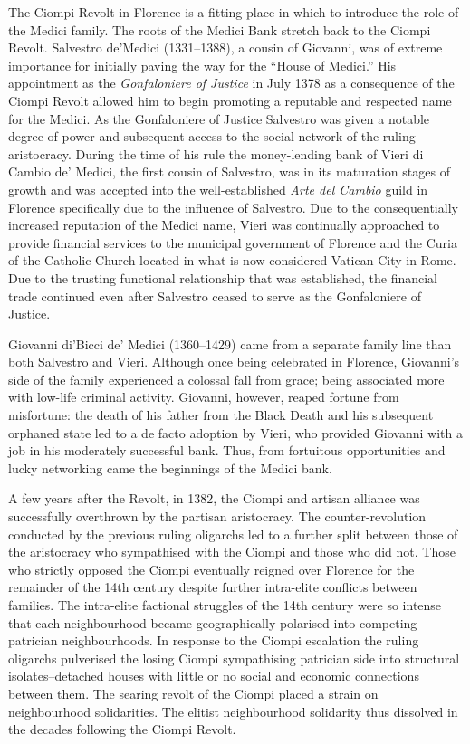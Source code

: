 The Ciompi Revolt in Florence is a fitting place in which to introduce the role of the Medici family. The roots of the Medici Bank stretch back to the Ciompi Revolt. Salvestro de'Medici (1331--1388), a cousin of Giovanni, was of extreme importance for initially paving the way for the ``House of Medici.'' His appointment as the \emph{Gonfaloniere of Justice} in July 1378 as a consequence of the Ciompi Revolt allowed him to begin promoting a reputable and respected name for the Medici. As the Gonfaloniere of Justice Salvestro was given a notable degree of power and subsequent access to the social network of the ruling aristocracy. During the time of his rule the money-lending bank of Vieri di Cambio de' Medici, the first cousin of Salvestro, was in its maturation stages of growth and was accepted into the well-established \emph{Arte del Cambio} guild in Florence specifically due to the influence of Salvestro. Due to the consequentially increased reputation of the Medici name, Vieri was continually approached to provide financial services to the municipal government of Florence and the Curia of the Catholic Church located in what is now considered Vatican City in Rome. Due to the trusting functional relationship that was established, the financial trade continued even after Salvestro ceased to serve as the Gonfaloniere of Justice.

Giovanni di'Bicci de' Medici (1360--1429) came from a separate family line than both Salvestro and Vieri. Although once being celebrated in Florence, Giovanni's side of the family experienced a colossal fall from grace; being associated more with low-life criminal activity. Giovanni, however, reaped fortune from misfortune: the death of his father from the Black Death and his subsequent orphaned state led to a de facto adoption by Vieri, who provided Giovanni with a job in his moderately successful bank. Thus, from fortuitous opportunities and lucky networking came the beginnings of the Medici bank.

A few years after the Revolt, in 1382, the Ciompi and artisan alliance was successfully overthrown by the partisan aristocracy. The counter-revolution conducted by the previous ruling oligarchs led to a further split between those of the aristocracy who sympathised with the Ciompi and those who did not. Those who strictly opposed the Ciompi eventually reigned over Florence for the remainder of the 14th century despite further intra-elite conflicts between families. The intra-elite factional struggles of the 14th century were so intense that each neighbourhood became geographically polarised into competing patrician neighbourhoods. In response to the Ciompi escalation the ruling oligarchs pulverised the losing Ciompi sympathising patrician side into structural isolates--detached houses with little or no social and economic connections between them. The searing revolt of the Ciompi placed a strain on neighbourhood solidarities. The elitist neighbourhood solidarity thus dissolved in the decades following the Ciompi Revolt.


